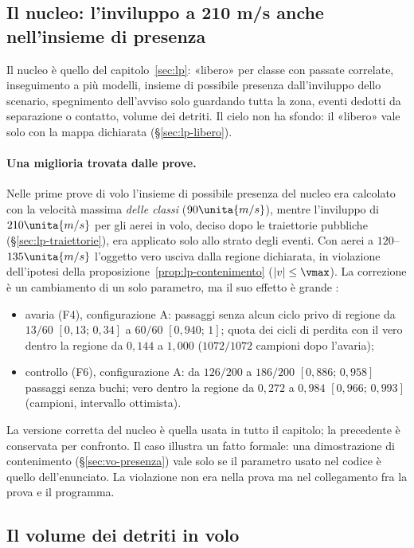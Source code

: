 \subsection{Il nucleo: l'inviluppo a 210 m/s anche nell'insieme di presenza}\label{sec:vo-nucleo}

Il nucleo è quello del capitolo~\ref{sec:lp}: «libero» per classe con passate correlate, inseguimento a più modelli, insieme di possibile presenza dall'inviluppo dello scenario, spegnimento dell'avviso solo guardando tutta la zona, eventi dedotti da separazione o contatto, volume dei detriti. Il cielo non ha sfondo: il «libero» vale solo con la mappa dichiarata (\S\ref{sec:lp-libero}).

\paragraph{Una miglioria trovata dalle prove.} Nelle prime prove di volo l'insieme di possibile presenza del nucleo era calcolato con la velocità massima \emph{delle classi} ($90\unita{m/s}$), mentre l'inviluppo di $210\unita{m/s}$ per gli aerei in volo, deciso dopo le traiettorie pubbliche (\S\ref{sec:lp-traiettorie}), era applicato solo allo strato degli eventi. Con aerei a $120$--$135\unita{m/s}$ l'oggetto vero usciva dalla regione dichiarata, in violazione dell'ipotesi della proposizione~\ref{prop:lp-contenimento} ($|v|\le\vmax$). La correzione è un cambiamento di un solo parametro, ma il suo effetto è grande :
\begin{itemize}
\item avaria (F4), configurazione A: passaggi senza alcun ciclo privo di regione da $13/60$ $[0{,}13;\,0{,}34]$ a $60/60$ $[0{,}940;\,1]$; quota dei cicli di perdita con il vero dentro la regione da $0{,}144$ a $1{,}000$ ($1072/1072$ campioni dopo l'avaria);
\item controllo (F6), configurazione A: da $126/200$ a $186/200$ $[0{,}886;\,0{,}958]$ passaggi senza buchi; vero dentro la regione da $0{,}272$ a $0{,}984$ $[0{,}966;\,0{,}993]$ (campioni, intervallo ottimista).
\end{itemize}
La versione corretta del nucleo è quella usata in tutto il capitolo; la precedente è conservata per confronto. Il caso illustra un fatto formale: una dimostrazione di contenimento (\S\ref{sec:vo-presenza}) vale solo se il parametro usato nel codice è quello dell'enunciato. La violazione non era nella prova ma nel collegamento fra la prova e il programma.

\subsection{Il volume dei detriti in volo}\label{sec:vo-detriti}

